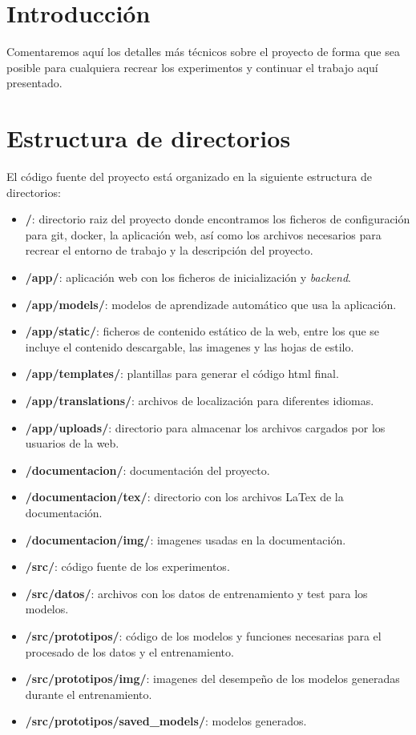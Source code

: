 
\section{Introducción}

Comentaremos aquí los detalles más técnicos sobre el proyecto de forma que sea posible para cualquiera recrear los experimentos y continuar el trabajo aquí presentado.

\section{Estructura de directorios}

El código fuente del proyecto está organizado en la siguiente estructura de directorios:

\begin{itemize}
    \item \textbf{/}: directorio raiz del proyecto donde encontramos los ficheros de configuración para git, docker, la aplicación web, así como los archivos necesarios para recrear el entorno de trabajo y la descripción del proyecto.
    \item \textbf{/app/}: aplicación web con los ficheros de inicialización y \textit{backend}.
    \item \textbf{/app/models/}: modelos de aprendizade automático que usa la aplicación.
    \item \textbf{/app/static/}: ficheros de contenido estático de la web, entre los que se incluye el contenido descargable, las imagenes y las hojas de estilo.    
    \item \textbf{/app/templates/}: plantillas para generar el código html final.
    \item \textbf{/app/translations/}: archivos de localización para diferentes idiomas.
    \item \textbf{/app/uploads/}: directorio para almacenar los archivos cargados por los usuarios de la web.
    \item \textbf{/documentacion/}: documentación del proyecto.
    \item \textbf{/documentacion/tex/}: directorio con los archivos LaTex de la documentación.
    \item \textbf{/documentacion/img/}: imagenes usadas en la documentación.
    \item \textbf{/src/}: código fuente de los experimentos.
    \item \textbf{/src/datos/}: archivos con los datos de entrenamiento y test para los modelos.
    \item \textbf{/src/prototipos/}: código de los modelos y funciones necesarias para el procesado de los datos y el entrenamiento.
    \item \textbf{/src/prototipos/img/}: imagenes del desempeño de los modelos generadas durante el entrenamiento.
    \item \textbf{/src/prototipos/saved\_models/}: modelos generados.
\end{itemize}

